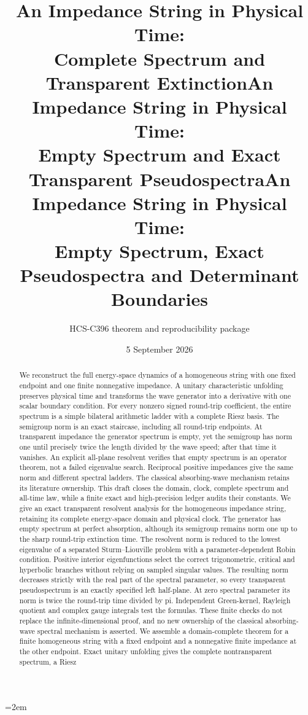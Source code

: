 \documentclass[10pt]{article}
\title{An Impedance String in Physical Time:\\Complete Spectrum and Transparent Extinction}
\title{An Impedance String in Physical Time:\\Empty Spectrum and Exact Transparent Pseudospectra}
\title{An Impedance String in Physical Time:\\Empty Spectrum, Exact Pseudospectra and Determinant Boundaries}
\author{HCS-C396 theorem and reproducibility package}
\date{5 September 2026}
\begin{document}
\emergencystretch=2em
\maketitle
\begin{abstract}
\ifcase\CRevisionRound
We reconstruct the full energy-space dynamics of a homogeneous string with
one fixed endpoint and one finite nonnegative impedance. A unitary
characteristic unfolding preserves physical time and transforms the wave
generator into a derivative with one scalar boundary condition.
For every nonzero signed round-trip coefficient, the entire spectrum is a
simple bilateral arithmetic ladder with a complete Riesz basis.
The semigroup norm is an exact staircase, including all round-trip endpoints.
At transparent impedance the generator spectrum is empty, yet the semigroup
has norm one until precisely twice the length divided by the wave speed;
after that time it vanishes. An explicit all-plane resolvent verifies that
empty spectrum is an operator theorem, not a failed eigenvalue search.
Reciprocal positive impedances give the same norm and different spectral
ladders. The classical absorbing-wave mechanism retains its literature
ownership. This draft closes the domain, clock, complete spectrum and all-time
law, while a finite exact and high-precision ledger audits their constants.
\or
We give an exact transparent resolvent analysis for the homogeneous
impedance string, retaining its complete energy-space domain and physical
clock. The generator has empty spectrum at perfect absorption, although its
semigroup remains norm one up to the sharp round-trip extinction time.
The resolvent norm is reduced to the lowest eigenvalue of a separated
Sturm--Liouville problem with a parameter-dependent Robin condition.
Positive interior eigenfunctions select the correct trigonometric,
critical and hyperbolic branches without relying on sampled singular values.
The resulting norm decreases strictly with the real part of the spectral
parameter, so every transparent pseudospectrum is an exactly specified left
half-plane. At zero spectral parameter its norm is twice the round-trip time
divided by pi. Independent Green-kernel, Rayleigh quotient and complex gauge
integrals test the formulas. These finite checks do not replace the
infinite-dimensional proof, and no new ownership of the classical
absorbing-wave spectral mechanism is asserted.
\else
We assemble a domain-complete theorem for a finite homogeneous string with
a fixed endpoint and a nonnegative finite impedance at the other endpoint.
Exact unitary unfolding gives the complete nontransparent spectrum, a Riesz

\end{abstract}
\end{document}

